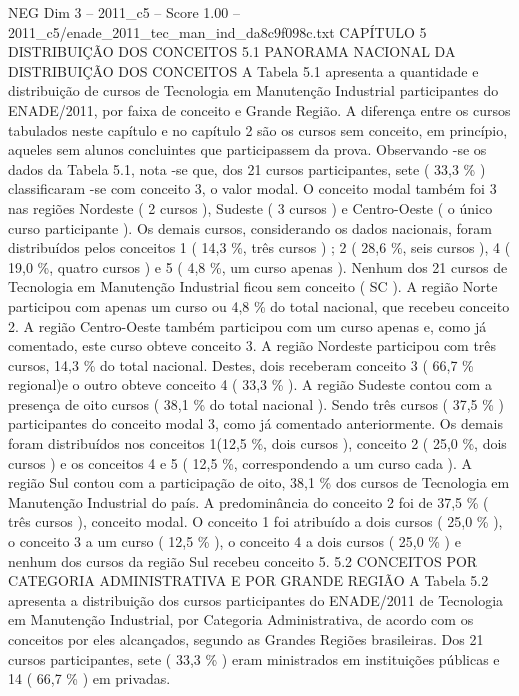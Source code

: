 \begin{textsample}{NEG Dim 3 – 2011\_c5 – Score 1.00 – 2011\_c5/enade\_2011\_tec\_man\_ind\_da8c9f098c.txt}  \label{ex:f3_neg_061}
CAPÍTULO 5 DISTRIBUIÇÃO DOS CONCEITOS 5.1 PANORAMA NACIONAL DA DISTRIBUIÇÃO DOS CONCEITOS A Tabela 5.1 apresenta a quantidade e distribuição de cursos de Tecnologia em Manutenção Industrial participantes do ENADE/2011, por faixa de conceito e Grande Região.
A diferença entre os cursos tabulados neste capítulo e no capítulo 2 são os cursos sem conceito, em princípio, aqueles sem alunos concluintes que participassem da prova.
Observando -se os dados da Tabela 5.1, nota -se que, dos 21 cursos participantes, sete ( 33,3 \% ) classificaram -se com conceito 3, o valor modal.
O conceito modal também foi 3 nas regiões Nordeste ( 2 cursos ), Sudeste ( 3 cursos ) e Centro-Oeste ( o único curso participante ).
Os demais cursos, considerando os dados nacionais, foram distribuídos pelos conceitos 1 ( 14,3 \%, três cursos ) ; 2 ( 28,6 \%, seis cursos ), 4 ( 19,0 \%, quatro cursos ) e 5 ( 4,8 \%, um curso apenas ).
Nenhum dos 21 cursos de Tecnologia em Manutenção Industrial ficou sem conceito ( SC ).
A região Norte participou com apenas um curso ou 4,8 \% do total nacional, que recebeu conceito 2.
A região Centro-Oeste também participou com um curso apenas e, como já comentado, este curso obteve conceito 3.
A região Nordeste participou com três cursos, 14,3 \% do total nacional.
Destes, dois receberam conceito 3 ( 66,7 \% regional)e o outro obteve conceito 4 ( 33,3 \% ).
A região Sudeste contou com a presença de oito cursos ( 38,1 \% do total nacional ).
Sendo três cursos ( 37,5 \% ) participantes do conceito modal 3, como já comentado anteriormente.
Os demais foram distribuídos nos conceitos 1(12,5 \%, dois cursos ), conceito 2 ( 25,0 \%, dois cursos ) e os conceitos 4 e 5 ( 12,5 \%, correspondendo a um curso cada ).
A região Sul contou com a participação de oito, 38,1 \% dos cursos de Tecnologia em Manutenção Industrial do país.
A predominância do conceito 2 foi de 37,5 \% ( três cursos ), conceito modal.
O conceito 1 foi atribuído a dois cursos ( 25,0 \% ), o conceito 3 a um curso ( 12,5 \% ), o conceito 4 a dois cursos ( 25,0 \% ) e nenhum dos cursos da região Sul recebeu conceito 5. 5.2 CONCEITOS POR CATEGORIA ADMINISTRATIVA E POR GRANDE REGIÃO A Tabela 5.2 apresenta a distribuição dos cursos participantes do ENADE/2011 de Tecnologia em Manutenção Industrial, por Categoria Administrativa, de acordo com os conceitos por eles alcançados, segundo as Grandes Regiões brasileiras.
Dos 21 cursos participantes, sete ( 33,3 \% ) eram ministrados em instituições públicas e 14 ( 66,7 \% ) em privadas.

\end{textsample}
